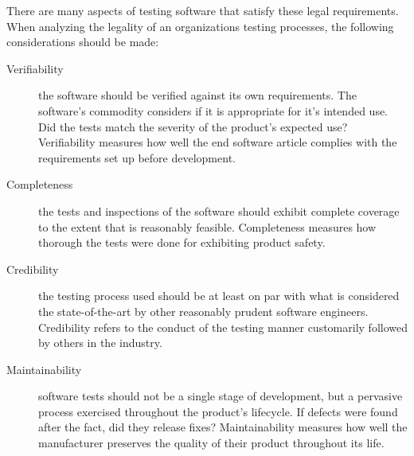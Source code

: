 There are many aspects of testing software that satisfy these legal
requirements. When analyzing the legality of an organizations testing processes,
the following considerations should be made:

\begin{description}
\item[Verifiability] the software should be verified against its own 
requirements. The software's commodity considers if it is appropriate for it's
intended use. Did the tests match the severity of the product's expected
use? Verifiability measures how well the end software article complies with the
requirements set up before development.
\item[Completeness] the tests and inspections of the software should exhibit
complete coverage to the extent that is reasonably feasible. Completeness measures how thorough the tests were done for exhibiting product
safety.
\item[Credibility] the testing process used should be at least on par with what
is considered the state-of-the-art by other reasonably prudent software
engineers. Credibility refers to the conduct of
the testing manner customarily followed by others in the industry.
\item[Maintainability] software tests should not be a single stage of
development, but a pervasive process exercised throughout the product's
lifecycle. If defects were found after the fact, did they release
fixes? Maintainability measures how well the manufacturer preserves the quality
of their product throughout its life.
\end{description}
